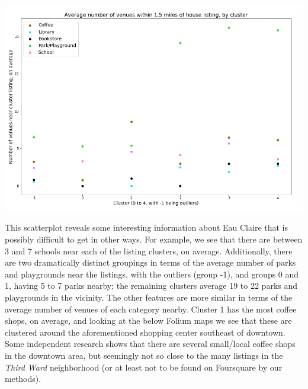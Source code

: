 \documentclass{article}
\begin{document}
\hspace{-2.5cm}\includegraphics[scale=0.43]{Avg_venues.png}

This scatterplot reveals some interesting information about Eau Claire that is possibly difficult to get in other ways. For example, we see that there are between 3 and 7 schools near each of the listing clusters, on average. Additionally, there are two dramatically distinct groupings in terms of the average number of parks and playgrounds near the listings, with the outliers (group -1), and groups 0 and 1, having 5 to 7 parks nearby; the remaining clusters average 19 to 22 parks and playgrounds in the vicinity. The other features are more similar in terms of the average number of venues of each category nearby. Cluster 1 has the most coffee shops, on average, and looking at the below Folium maps we see that these are clustered around the aforementioned shopping center southeast of downtown. Some independent research shows that there are several small/local coffee shops in the downtown area, but seemingly not so close to the many listings in the {\em Third Ward} neighborhood (or at least not to be found on Foursquare by our methods).
\end{document}
